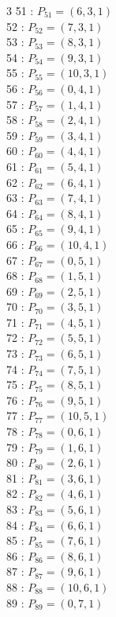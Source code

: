 \documentclass{article}
\begin{document}
{\begin{multicols}{3}
51 : $P_{51}=( 6, 3, 1 )$\\
52 : $P_{52}=( 7, 3, 1 )$\\
53 : $P_{53}=( 8, 3, 1 )$\\
54 : $P_{54}=( 9, 3, 1 )$\\
55 : $P_{55}=( 10, 3, 1 )$\\
56 : $P_{56}=( 0, 4, 1 )$\\
57 : $P_{57}=( 1, 4, 1 )$\\
58 : $P_{58}=( 2, 4, 1 )$\\
59 : $P_{59}=( 3, 4, 1 )$\\
60 : $P_{60}=( 4, 4, 1 )$\\
61 : $P_{61}=( 5, 4, 1 )$\\
62 : $P_{62}=( 6, 4, 1 )$\\
63 : $P_{63}=( 7, 4, 1 )$\\
64 : $P_{64}=( 8, 4, 1 )$\\
65 : $P_{65}=( 9, 4, 1 )$\\
66 : $P_{66}=( 10, 4, 1 )$\\
67 : $P_{67}=( 0, 5, 1 )$\\
68 : $P_{68}=( 1, 5, 1 )$\\
69 : $P_{69}=( 2, 5, 1 )$\\
70 : $P_{70}=( 3, 5, 1 )$\\
71 : $P_{71}=( 4, 5, 1 )$\\
72 : $P_{72}=( 5, 5, 1 )$\\
73 : $P_{73}=( 6, 5, 1 )$\\
74 : $P_{74}=( 7, 5, 1 )$\\
75 : $P_{75}=( 8, 5, 1 )$\\
76 : $P_{76}=( 9, 5, 1 )$\\
77 : $P_{77}=( 10, 5, 1 )$\\
78 : $P_{78}=( 0, 6, 1 )$\\
79 : $P_{79}=( 1, 6, 1 )$\\
80 : $P_{80}=( 2, 6, 1 )$\\
81 : $P_{81}=( 3, 6, 1 )$\\
82 : $P_{82}=( 4, 6, 1 )$\\
83 : $P_{83}=( 5, 6, 1 )$\\
84 : $P_{84}=( 6, 6, 1 )$\\
85 : $P_{85}=( 7, 6, 1 )$\\
86 : $P_{86}=( 8, 6, 1 )$\\
87 : $P_{87}=( 9, 6, 1 )$\\
88 : $P_{88}=( 10, 6, 1 )$\\
89 : $P_{89}=( 0, 7, 1 )$\\

\end{multicols}}
\end{document}
